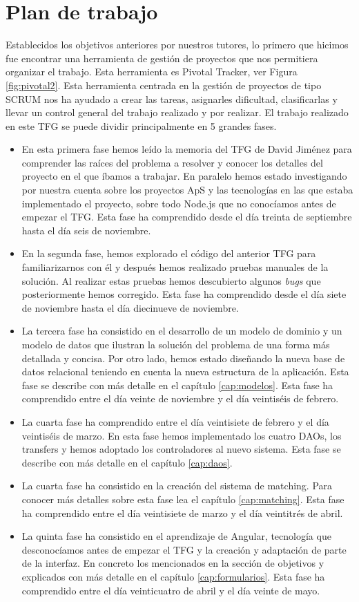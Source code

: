 \documentclass[11pt]{book}
\begin{document}
\section{Plan de trabajo}
Establecidos los objetivos anteriores por nuestros tutores, lo primero que hicimos fue encontrar una herramienta de gestión de proyectos que nos permitiera organizar el trabajo. Esta herramienta es Pivotal Tracker, ver Figura \ref{fig:pivotal2}. Esta herramienta centrada en la gestión de proyectos de tipo SCRUM nos ha ayudado a crear las tareas, asignarles dificultad, clasificarlas y llevar un control general del trabajo realizado y por realizar. El trabajo realizado en este TFG se puede dividir principalmente en 5 grandes fases.
\begin{itemize} 
	\item En esta primera fase hemos leído la memoria del TFG de David Jiménez para comprender las raíces del problema a resolver y conocer los detalles del proyecto en el que íbamos a trabajar. En paralelo hemos estado investigando por nuestra cuenta sobre los proyectos ApS y las tecnologías en las que estaba implementado el proyecto, sobre todo Node.js que no conocíamos antes de empezar el TFG. Esta fase ha comprendido desde el día treinta de septiembre hasta el día seis de noviembre.
	\item En la segunda fase, hemos explorado el código del anterior TFG para familiarizarnos con él y después hemos realizado pruebas manuales de la solución. Al realizar estas pruebas hemos descubierto algunos \textit{bugs} que posteriormente hemos corregido. Esta fase ha comprendido desde el día siete de noviembre hasta el día diecinueve de noviembre.
	\item La tercera fase ha consistido en el desarrollo de un modelo de dominio y un modelo de datos que ilustran la solución del problema de una forma más detallada y concisa. Por otro lado, hemos estado diseñando la nueva base de datos relacional teniendo en cuenta la nueva estructura de la aplicación. Esta fase se describe con más detalle en el capítulo \ref{cap:modelos}. Esta fase ha comprendido entre el día veinte de noviembre y el día veintiséis de febrero.
	\item La cuarta fase ha comprendido entre el día veintisiete de febrero y  el día veintiséis de marzo. En esta fase hemos implementado los cuatro DAOs, los transfers y hemos adoptado los controladores al nuevo sistema. Esta fase se describe con más detalle en el capítulo \ref{cap:daos}.
	\item La cuarta fase ha consistido en la creación del sistema de matching. Para conocer más detalles sobre esta fase lea el capítulo \ref{cap:matching}. Esta fase ha comprendido entre el día veintisiete de marzo y el día veintitrés de abril.
	\item La quinta fase ha consistido en el aprendizaje de Angular, tecnología que desconocíamos antes de empezar el TFG y la creación y adaptación de parte de la interfaz. En concreto los mencionados en la sección de objetivos y explicados con más detalle en el capítulo \ref{cap:formularios}. Esta fase ha comprendido entre el día veinticuatro de abril y el día veinte de mayo.
\listoffigures

\end{itemize}
\end{document}
